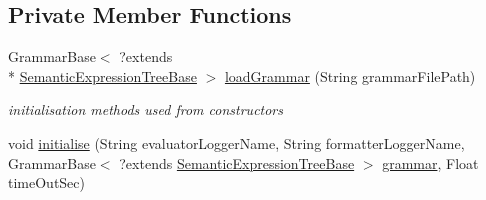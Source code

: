 \subsection*{Private Member Functions}
\begin{DoxyCompactItemize}
\item 
Grammar\-Base$<$ ?extends \\*
\hyperlink{interfaceit_1_1emarolab_1_1cagg_1_1core_1_1evaluation_1_1semanticGrammar_1_1syntaxCompiler_1_1SemanticExpressionTreeBase}{Semantic\-Expression\-Tree\-Base} $>$ \hyperlink{classit_1_1emarolab_1_1cagg_1_1core_1_1evaluation_1_1interfacing_1_1GrammarTesterBase_acf5bfed217147dbf2c62954b59a203ff}{load\-Grammar} (String grammar\-File\-Path)
\begin{DoxyCompactList}\small\item\em initialisation methods used from constructors \end{DoxyCompactList}\item 
void \hyperlink{classit_1_1emarolab_1_1cagg_1_1core_1_1evaluation_1_1interfacing_1_1GrammarTesterBase_af698a620944b547771206862df45a988}{initialise} (String evaluator\-Logger\-Name, String formatter\-Logger\-Name, Grammar\-Base$<$ ?extends \hyperlink{interfaceit_1_1emarolab_1_1cagg_1_1core_1_1evaluation_1_1semanticGrammar_1_1syntaxCompiler_1_1SemanticExpressionTreeBase}{Semantic\-Expression\-Tree\-Base} $>$ \hyperlink{classit_1_1emarolab_1_1cagg_1_1core_1_1evaluation_1_1interfacing_1_1GrammarTesterBase_ac6601808f37ef4327e6308143f01dc6a}{grammar}, Float time\-Out\-Sec)
\end{DoxyCompactItemize}
